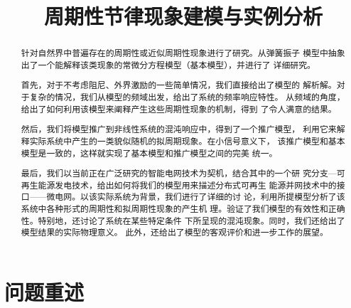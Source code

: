 \documentclass[withoutpreface,bwprint]{cumcmthesis} %
\title{周期性节律现象建模与实例分析}
\begin{document}
 \maketitle

 \begin{abstract}
针对自然界中普遍存在的周期性或近似周期性现象进行了研究。从弹簧振子
模型中抽象出了一个能解释该类现象的常微分方程模型（基本模型），并进行了
详细研究。

首先，对于不考虑阻尼、外界激励的一些简单情况，我们直接给出了模型的
解析解。对于复杂的情况，我们从模型的频域出发，给出了系统的频率响应特性。
从频域的角度，给出了如何利用该模型来阐释产生这些周期性现象的机制，得到
了令人满意的结果。

然后，我们将模型推广到非线性系统的混沌响应中，得到了一个推广模型，
利用它来解释实际系统中产生的一类貌似随机的拟周期现象。在小信号意义下，
该推广模型和基本模型是一致的，这样就实现了基本模型和推广模型之间的完美
统一。

最后，我们以当前正在广泛研究的智能电网技术为契机，结合其中的一个研
究分支—可再生能源发电技术，给出如何将我们的模型用来描述分布式可再生
能源并网技术中的接口——微电网。以该实际系统为背景，我们进行了详细的讨
论，利用所提模型分析了该系统中各种形式的周期性和拟周期性现象的产生机
理。验证了我们模型的有效性和正确性。特别地，还讨论了系统在某些特定条件
下所呈现的混沌现象。同时，我们还给出了模型结果的实际物理意义。
此外，还给出了模型的客观评价和进一步工作的展望。


\vfill


\end{abstract}



\section{问题重述}
\label{sec1}
\end{document}
